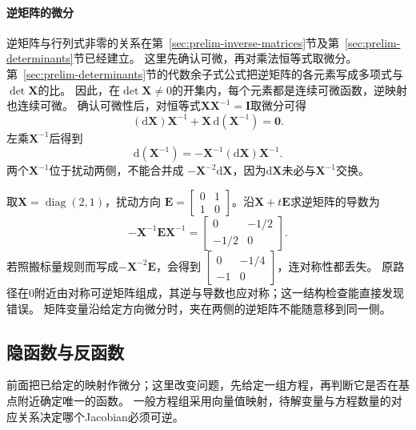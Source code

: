 \paragraph{逆矩阵的微分}
逆矩阵与行列式非零的关系在第~\ref{sec:prelim-inverse-matrices}节及第~\ref{sec:prelim-determinants}节已经建立。
这里先确认可微，再对乘法恒等式取微分。
第~\ref{sec:prelim-determinants}节的代数余子式公式把逆矩阵的各元素写成多项式与$\det\bm X$的比。
因此，在$\det\bm X\neq0$的开集内，每个元素都是连续可微函数，逆映射也连续可微。
确认可微性后，对恒等式$\bm{X}\bm{X}^{-1}=\bm{I}$取微分可得
\[   (\mathrm{d}\bm{X})\bm{X}^{-1}   +\bm{X}\,\mathrm{d}(\bm{X}^{-1})=\bm{0}. \]
左乘$\bm{X}^{-1}$后得到
\begin{equation}
  \mathrm{d}(\bm{X}^{-1})
  =
  -\bm{X}^{-1}(\mathrm{d}\bm{X})\bm{X}^{-1}.
\label{eq:analysis-inverse-differential}
\end{equation}
两个$\bm{X}^{-1}$位于扰动两侧，不能合并成 $-\bm{X}^{-2}\mathrm{d}\bm{X}$，因为$\mathrm{d}\bm{X}$未必与$\bm{X}^{-1}$交换。



\begin{example}[逆矩阵微分中的乘法次序]
\label{ex:analysis-noncommuting-inverse-differential}
取$\bm X=\operatorname{diag}(2,1)$，扰动方向
$\bm E=\begin{bmatrix}0&1\\1&0\end{bmatrix}$。沿$\bm X+t\bm E$求逆矩阵的导数为
\[
 -\bm X^{-1}\bm E\bm X^{-1}
 =\begin{bmatrix}0&-1/2\\-1/2&0\end{bmatrix}.
\]
若照搬标量规则而写成$-\bm X^{-2}\bm E$，会得到
$\begin{bmatrix}0&-1/4\\-1&0\end{bmatrix}$，连对称性都丢失。
原路径在$0$附近由对称可逆矩阵组成，其逆与导数也应对称；这一结构检查能直接发现错误。
矩阵变量沿给定方向微分时，夹在两侧的逆矩阵不能随意移到同一侧。
\end{example}

\subsection{隐函数与反函数}
\label{sec:analysis-implicit-parameter-integral}

前面把已给定的映射作微分；这里改变问题，先给定一组方程，再判断它是否在基点附近确定唯一的函数。
一般方程组采用向量值映射，待解变量与方程数量的对应关系决定哪个Jacobian必须可逆。

